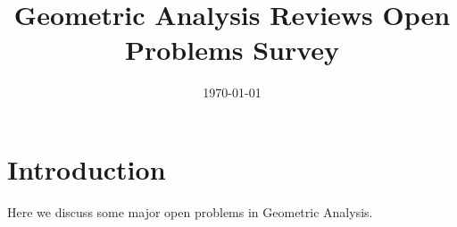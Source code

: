 \documentclass{amsart}
\title[GA Rev Survey]
 {Geometric Analysis Reviews Open Problems Survey}
\date{\today}
\begin{document}
\maketitle

\section{Introduction}
\label{sec:intro}

Here we discuss some major open problems in Geometric Analysis.
\end{document}
